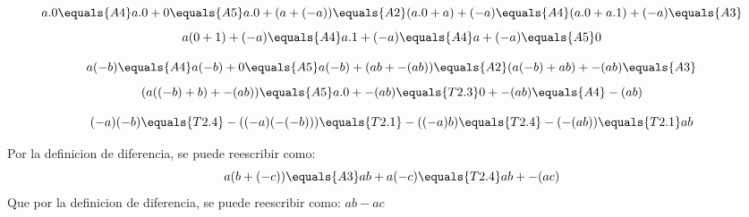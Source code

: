 \documentclass[10pt]{article}
\begin{document}
\begin{prf}{}
$$a.0 \equals{A4} a.0+0 \equals{A5} a.0+(a+(-a)) \equals{A2} (a.0+a)+(-a) \equals{A4} (a.0+a.1)+(-a) \equals{A3}$$
$$a(0+1)+(-a) \equals{A4} a.1+(-a) \equals{A4} a+(-a) \equals{A5} 0$$
\end{prf}

\begin{prf}[$a(-b)=-(ab)=(-a)b$]{}
$$
a(-b) \equals{A4}
a(-b)+0 \equals{A5}
a(-b)+(ab+-(ab)) \equals{A2}
(a(-b)+ab)+-(ab) \equals{A3}$$$$
(a((-b)+b)+-(ab)) \equals{A5}
a.0+-(ab) \equals{T2.3}
0+-(ab) \equals{A4}
-(ab)
$$
\end{prf}

\begin{prf}[$(-a)(-b)=ab$]{}
$$
(-a)(-b) \equals{T2.4}
-((-a)(-(-b))) \equals{T2.1}
-((-a)b) \equals{T2.4}
-(-(ab)) \equals{T2.1}
ab
$$
\end{prf}

\begin{prf}[$a(b-c)=ab-ac$]{}
Por la definicion de diferencia, se puede reescribir como:
$$
a(b+(-c)) \equals{A3}
ab+a(-c) \equals{T2.4}
ab+-(ac)
$$
Que por la definicion de diferencia, se puede reescribir como: $ab-ac$
\end{prf}
\end{document}
